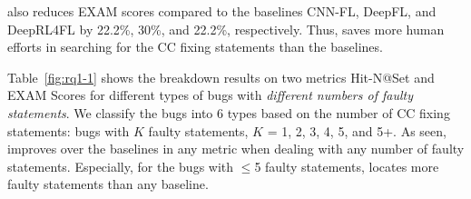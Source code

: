 
{\tool} also reduces EXAM scores compared to the baselines CNN-FL,
DeepFL, and DeepRL4FL by 22.2\%, 30\%, and 22.2\%, respectively. Thus,
{\tool} saves more human efforts in searching for the CC fixing
statements than the baselines.



Table~\ref{fig:rq1-1} shows the breakdown results on two metrics
Hit-N@Set and EXAM Scores for different types of bugs with {\em
different numbers of faulty statements}. We classify the bugs into 6
types based on the number of CC fixing statements: bugs with $K$
faulty statements, $K$ = 1, 2, 3, 4, 5, and 5+. As seen, {\tool}
improves over the baselines in any metric when dealing with any number
of faulty statements. Especially, for the bugs with $\leq$5 faulty
statements, {\tool} locates more faulty statements than any baseline.

